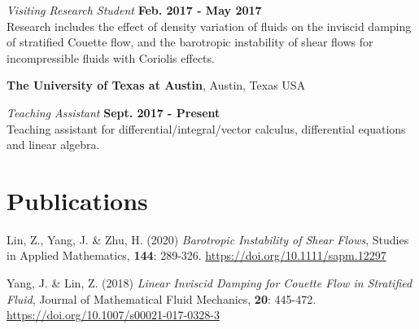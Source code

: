 \documentclass[margin,line]{res}
\begin{document}
\begin{resume}

{\em Visiting Research Student} \hfill {\bf Feb. 2017 - May 2017}\\
Research includes the effect of density variation of fluids on the inviscid damping of stratified Couette flow, and the barotropic instability of shear flows for incompressible fluids with Coriolis effects.

{\bf The University of Texas at Austin}, Austin, Texas USA

{\em Teaching Assistant} \hfill {\bf Sept. 2017 - Present}\\
Teaching assistant for differential/integral/vector calculus, differential equations and linear algebra.


\section{\sc Publications}

\begin{etaremune}[leftmargin=0.02in, start=2]
    \item Lin, Z., Yang, J. \& Zhu, H. (2020) \textit{Barotropic Instability of Shear Flows}, Studies in Applied Mathematics, \textbf{144}: 289-326. 
    \href{https://doi.org/10.1111/sapm.12297}{https://doi.org/10.1111/sapm.12297} 
    \item Yang, J. \& Lin, Z. (2018) \textit{Linear Inviscid Damping for Couette Flow in Stratified Fluid}, Journal of Mathematical Fluid Mechanics, \textbf{20}: 445-472. \href{https://doi.org/10.1007/s00021-017-0328-3}{https://doi.org/10.1007/s00021-017-0328-3}
\end{etaremune}


\end{resume}
\end{document}
